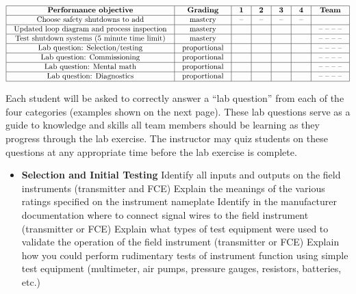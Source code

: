 $$\vbox{\offinterlineskip
\halign{\strut
\vrule \quad\hfil # \ \hfil & 
\vrule \quad\hfil # \ \hfil & 
\vrule \quad\hfil # \ \hfil & 
\vrule \quad\hfil # \ \hfil & 
\vrule \quad\hfil # \ \hfil & 
\vrule \quad\hfil # \ \hfil & 
\vrule \quad\hfil # \ \hfil \vrule \cr
\noalign{\hrule}
%
{\bf Performance objective} & {\bf Grading} & {\bf 1} & {\bf 2} & {\bf 3} & {\bf 4} & {\bf Team} \cr
%
\noalign{\hrule}
%
Choose safety shutdowns to add & mastery & -- & -- & -- & -- & \cr
%
\noalign{\hrule}
%
Updated loop diagram and process inspection & mastery & & & & & -- -- -- -- \cr
%
\noalign{\hrule}
%
Test shutdown systems (5 minute time limit) & mastery & & & & & -- -- -- -- \cr
%
\noalign{\hrule}
%
Lab question: Selection/testing & proportional &  &  &  &  & -- -- -- -- \cr
%
\noalign{\hrule}
%
Lab question: Commissioning & proportional &  &  &  &  & -- -- -- -- \cr
%
\noalign{\hrule}
%
Lab question: Mental math & proportional &  &  &  &  & -- -- -- -- \cr
%
\noalign{\hrule}
%
Lab question: Diagnostics & proportional &  &  &  &  & -- -- -- -- \cr
%
\noalign{\hrule}
} %
}$$ %

Each student will be asked to correctly answer a ``lab question'' from each of the four categories (examples shown on the next page).  These lab questions serve as a guide to knowledge and skills all team members should be learning as they progress through the lab exercise.  The instructor may quiz students on these questions at any appropriate time before the lab exercise is complete.

\vfil \eject

\noindent
{} 

\begin{itemize}
\item{} {\bf Selection and Initial Testing}
\itemitem{} Identify all inputs and outputs on the field instruments (transmitter and FCE)
\itemitem{} Explain the meanings of the various ratings specified on the instrument nameplate
\itemitem{} Identify in the manufacturer documentation where to connect signal wires to the field instrument (transmitter or FCE)
\itemitem{} Explain what types of test equipment were used to validate the operation of the field instrument (transmitter or FCE)
\itemitem{} Explain how you could perform rudimentary tests of instrument function using simple test equipment (multimeter, air pumps, pressure gauges, resistors, batteries, etc.)
\end{itemize}

